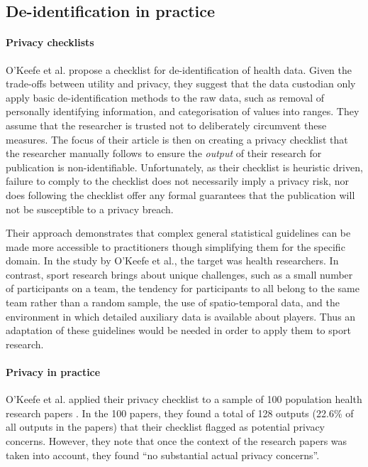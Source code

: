 
\pagebreak{}

\subsection{De-identification in practice}

\paragraph{Privacy checklists}

O'Keefe et al. \cite{OKeefe2017} propose a checklist for de-identification of health data. Given the trade-offs between utility and privacy, they suggest that the data custodian only apply basic de-identification methods to the raw data, such as removal of personally identifying information, and categorisation of values into ranges. They assume that the researcher is trusted not to deliberately circumvent these measures. The focus of their article is then on creating a privacy checklist that the researcher manually follows to ensure the \textit{output} of their research for publication is non-identifiable. Unfortunately, as their checklist is heuristic driven, failure to comply to the checklist does not necessarily imply a privacy risk, nor does following the checklist offer any formal guarantees that the publication will not be susceptible to a privacy breach.

Their approach demonstrates that complex general statistical guidelines can be made more accessible to practitioners though simplifying them for the specific domain. In the study by O'Keefe et al., the target was health researchers. In contrast, sport research brings about unique challenges, such as a small number of participants on a team, the tendency for participants to all belong to the same team rather than a random sample, the use of spatio-temporal data, and the environment in which detailed auxiliary data is available about players. Thus an adaptation of these guidelines would be needed in order to apply them to sport research.

\paragraph{Privacy in practice}

O'Keefe et al. applied their privacy checklist to a sample of 100 population health research papers \cite{OKeefe2018}. In the 100 papers, they found a total of 128 outputs (22.6\% of all outputs in the papers) that their checklist flagged as potential privacy concerns. However, they note that once the context of the research papers was taken into account, they found ``no substantial actual privacy concerns''.

